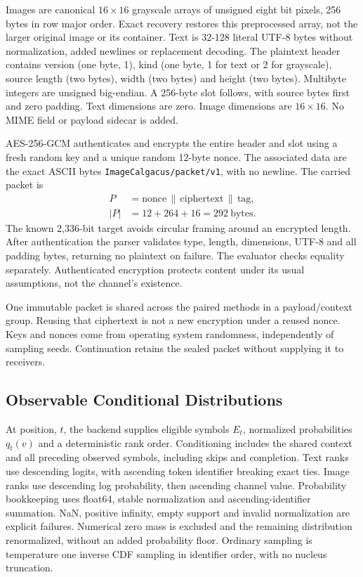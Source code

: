 \documentclass[a4paper,twoside]{article}
\begin{document}
Images are canonical $16\times16$ grayscale arrays of unsigned eight bit pixels, 256 bytes in row major order. Exact recovery restores this preprocessed array, not the larger original image or its container. Text is 32-128 literal UTF-8 bytes without normalization, added newlines or replacement decoding.
The plaintext header contains version (one byte, 1), kind (one byte, 1 for text or 2 for grayscale), source length (two bytes), width (two bytes) and height (two bytes). Multibyte integers are unsigned big-endian. A 256-byte slot follows, with source bytes first and zero padding. Text dimensions are zero. Image dimensions are $16\times16$. No MIME field or payload sidecar is added.

AES-256-GCM \cite{gcm} authenticates and encrypts the entire header and slot using a fresh random key and a unique random 12-byte nonce. The associated data are the exact ASCII bytes \texttt{ImageCalgacus/packet/v1}, with no newline. The carried packet is
\begin{equation}
\begin{aligned}
P&=\text{nonce}\,\|\,\text{ciphertext}\,\|\,\text{tag},\\
|P|&=12+264+16=292\ \text{bytes}.
\end{aligned}
\label{eq:packet}
\end{equation}
The known 2,336-bit target avoids circular framing around an encrypted length. After authentication the parser validates type, length, dimensions, UTF-8 and all padding bytes, returning no plaintext on failure. The evaluator checks equality separately. Authenticated encryption protects content under its usual assumptions, not the channel's existence.

One immutable packet is shared across the paired methods in a payload/context group. Reusing that ciphertext is not a new encryption under a reused nonce. Keys and nonces come from operating system randomness, independently of sampling seeds. Continuation retains the sealed packet without supplying it to receivers.


\subsection{Observable Conditional Distributions}
At position, $t$, the backend supplies eligible symbols $E_t$, normalized probabilities $q_t(v)$ and a deterministic rank order. Conditioning includes the shared context and all preceding observed symbols, including skips and completion. Text ranks use descending logits, with ascending token identifier breaking exact ties. Image ranks use descending log probability, then ascending channel value. Probability bookkeeping uses float64, stable normalization and ascending-identifier summation. NaN, positive infinity, empty support and invalid normalization are explicit failures. Numerical zero mass is excluded and the remaining distribution renormalized, without an added probability floor. Ordinary sampling is temperature one inverse CDF sampling in identifier order, with no nucleus truncation.
\end{document}
